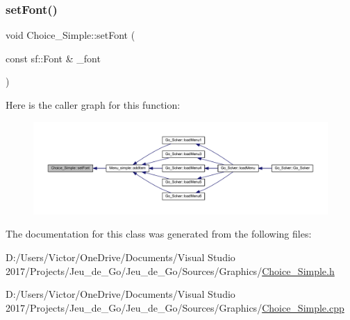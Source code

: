 \subsubsection{\texorpdfstring{set\+Font()}{setFont()}}
{\footnotesize\ttfamily void Choice\+\_\+\+Simple\+::set\+Font (\begin{DoxyParamCaption}\item[{const sf\+::\+Font \&}]{\+\_\+font }\end{DoxyParamCaption})}

Here is the caller graph for this function\+:
\nopagebreak
\begin{figure}[H]
\begin{center}
\leavevmode
\includegraphics[width=350pt]{class_choice___simple_a035e32f90e4561b666b6571bce06e207_icgraph}
\end{center}
\end{figure}


The documentation for this class was generated from the following files\+:\begin{DoxyCompactItemize}
\item 
D\+:/\+Users/\+Victor/\+One\+Drive/\+Documents/\+Visual Studio 2017/\+Projects/\+Jeu\+\_\+de\+\_\+\+Go/\+Jeu\+\_\+de\+\_\+\+Go/\+Sources/\+Graphics/\hyperlink{_choice___simple_8h}{Choice\+\_\+\+Simple.\+h}\item 
D\+:/\+Users/\+Victor/\+One\+Drive/\+Documents/\+Visual Studio 2017/\+Projects/\+Jeu\+\_\+de\+\_\+\+Go/\+Jeu\+\_\+de\+\_\+\+Go/\+Sources/\+Graphics/\hyperlink{_choice___simple_8cpp}{Choice\+\_\+\+Simple.\+cpp}\end{DoxyCompactItemize}
